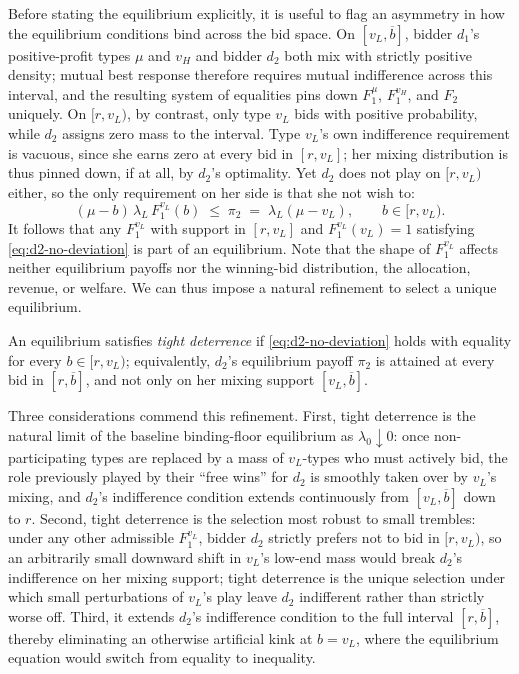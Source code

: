 \noindent Before stating the equilibrium explicitly, it is useful to flag an asymmetry in how the equilibrium conditions bind across the bid space. On $[v_L, \overline{b}]$, bidder $d_1$'s positive-profit types $\mu$ and $v_H$ and bidder $d_2$ both mix with strictly positive density; mutual best response therefore requires mutual indifference across this interval, and the resulting system of equalities pins down $F_1^{\mu}$, $F_1^{v_H}$, and $F_2$ uniquely. On $[r, v_L)$, by contrast, only type $v_L$ bids with positive probability, while $d_2$ assigns zero mass to the interval. Type $v_L$'s own indifference requirement is vacuous, since she earns zero at every bid in $[r, v_L]$; her mixing distribution is thus pinned down, if at all, by $d_2$'s optimality. Yet $d_2$ does not play on $[r, v_L)$ either, so the only requirement on her side is that she not wish to:
\begin{equation}\label{eq:d2-no-deviation}
(\mu - b)\,\lambda_L\,F_1^{v_L}(b) \;\le\; \pi_2 \;=\; \lambda_L(\mu - v_L), \qquad b\in[r,v_L).
\end{equation}
It follows that any $F_1^{v_L}$ with support in $[r, v_L]$ and $F_1^{v_L}(v_L) = 1$ satisfying \eqref{eq:d2-no-deviation} is part of an equilibrium. Note that the shape of $F_1^{v_L}$ affects neither equilibrium payoffs nor the winning-bid distribution, the allocation, revenue, or welfare. We can thus impose a natural refinement to select a unique equilibrium.

\begin{defn}\label{def:tight-deterrence}
An equilibrium satisfies \textit{tight deterrence} if \eqref{eq:d2-no-deviation} holds with equality for every $b \in [r, v_L)$; equivalently, $d_2$'s equilibrium payoff $\pi_2$ is attained at every bid in $[r, \overline{b}]$, and not only on her mixing support $[v_L, \overline{b}]$.
\end{defn}

\noindent Three considerations commend this refinement. First, tight deterrence is the natural limit of the baseline binding-floor equilibrium as $\lambda_0 \downarrow 0$: once non-participating types are replaced by a mass of $v_L$-types who must actively bid, the role previously played by their ``free wins'' for $d_2$ is smoothly taken over by $v_L$'s mixing, and $d_2$'s indifference condition extends continuously from $[v_L, \overline{b}]$ down to $r$. Second, tight deterrence is the selection most robust to small trembles: under any other admissible $F_1^{v_L}$, bidder $d_2$ strictly prefers not to bid in $[r, v_L)$, so an arbitrarily small downward shift in $v_L$'s low-end mass would break $d_2$'s indifference on her mixing support; tight deterrence is the unique selection under which small perturbations of $v_L$'s play leave $d_2$ indifferent rather than strictly worse off. Third, it extends $d_2$'s indifference condition to the full interval $[r, \overline{b}]$, thereby eliminating an otherwise artificial kink at $b = v_L$, where the equilibrium equation would switch from equality to inequality.

